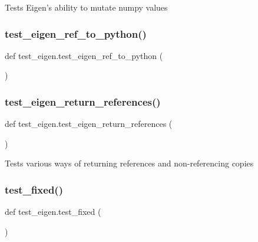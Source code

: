 \begin{DoxyVerb}Tests Eigen's ability to mutate numpy values\end{DoxyVerb}
 \mbox{\label{namespacetest__eigen_aa3f3ef0aaadc344c5582c45e225b33b1}} 
\subsubsection{\texorpdfstring{test\_eigen\_ref\_to\_python()}{test\_eigen\_ref\_to\_python()}}
{\footnotesize\ttfamily def test\+\_\+eigen.\+test\+\_\+eigen\+\_\+ref\+\_\+to\+\_\+python (\begin{DoxyParamCaption}{ }\end{DoxyParamCaption})}

\mbox{\label{namespacetest__eigen_acfae2bd075543f6187c7849ddba6ae7c}} 
\subsubsection{\texorpdfstring{test\_eigen\_return\_references()}{test\_eigen\_return\_references()}}
{\footnotesize\ttfamily def test\+\_\+eigen.\+test\+\_\+eigen\+\_\+return\+\_\+references (\begin{DoxyParamCaption}{ }\end{DoxyParamCaption})}

\begin{DoxyVerb}Tests various ways of returning references and non-referencing copies\end{DoxyVerb}
 \mbox{\label{namespacetest__eigen_a103972bbd9a4dec9272278be8636d107}} 
\subsubsection{\texorpdfstring{test\_fixed()}{test\_fixed()}}
{\footnotesize\ttfamily def test\+\_\+eigen.\+test\+\_\+fixed (\begin{DoxyParamCaption}{ }\end{DoxyParamCaption})}

